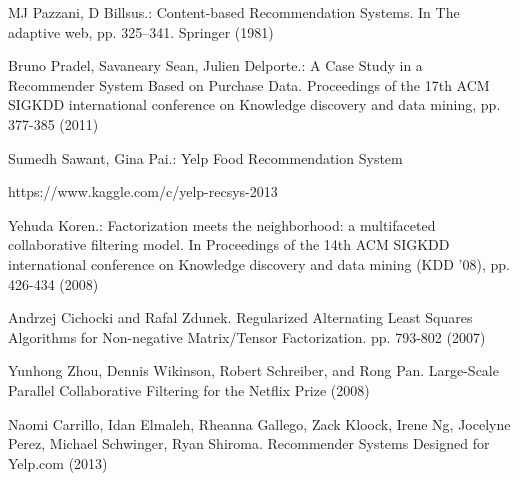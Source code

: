 \documentclass{llncs}
\begin{document}
%
%
\begin{thebibliography}{5}
%
MJ Pazzani, D Billsus.:
Content-based Recommendation Systems. In The adaptive web, pp. 325–341. Springer (1981) 

Bruno Pradel, Savaneary Sean, Julien Delporte.: 
A Case Study in a Recommender System Based on Purchase Data. Proceedings of the 17th ACM SIGKDD international conference on Knowledge discovery and data mining, pp. 377-385 (2011)

Sumedh Sawant, Gina Pai.:
Yelp Food Recommendation System

https://www.kaggle.com/c/yelp-recsys-2013

Yehuda Koren.: 
Factorization meets the neighborhood: a multifaceted collaborative filtering model. In Proceedings of the 14th ACM SIGKDD international conference on Knowledge discovery and data mining (KDD '08), pp. 426-434 (2008)

Andrzej Cichocki and Rafal Zdunek. Regularized Alternating Least Squares Algorithms for Non-negative Matrix/Tensor Factorization. pp. 793-802 (2007)

Yunhong Zhou, Dennis Wikinson, Robert Schreiber, and Rong Pan. Large-Scale Parallel Collaborative Filtering for the Netflix Prize (2008)

Naomi Carrillo, Idan Elmaleh, Rheanna Gallego, Zack Kloock, Irene Ng, Jocelyne Perez, Michael Schwinger, Ryan Shiroma. Recommender Systems Designed for Yelp.com (2013)


\end{thebibliography}
\end{document}

